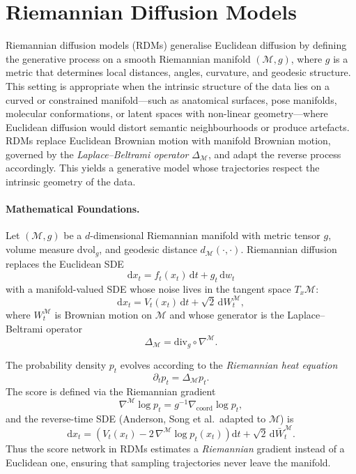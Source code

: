 \section{Riemannian Diffusion Models}
\label{sec:riemannian_diffusion_models}
Riemannian diffusion models (RDMs) generalise Euclidean diffusion by defining
the generative process on a smooth Riemannian manifold $(\mathcal{M},g)$, where
$g$ is a metric that determines local distances, angles, curvature, and
geodesic structure. This setting is appropriate when the intrinsic structure of
the data lies on a curved or constrained manifold—such as anatomical surfaces,
pose manifolds, molecular conformations, or latent spaces with non-linear
geometry—where Euclidean diffusion would distort semantic neighbourhoods or
produce artefacts. RDMs replace Euclidean Brownian motion with manifold
Brownian motion, governed by the \emph{Laplace–Beltrami operator}
$\Delta_{\mathcal{M}}$, and adapt the reverse process accordingly. This yields
a generative model whose trajectories respect the intrinsic geometry of the
data.

\paragraph{Mathematical Foundations.}

Let $(\mathcal{M}, g)$ be a $d$-dimensional Riemannian manifold with metric
tensor $g$, volume measure $\mathrm{d}\mathrm{vol}_g$, and geodesic distance
$d_{\mathcal{M}}(\cdot,\cdot)$. Riemannian diffusion replaces the Euclidean SDE
\[
\mathrm{d}x_t
    = f_t(x_t)\,\mathrm{d}t + g_t \,\mathrm{d}w_t
\]
with a manifold-valued SDE whose noise lives in the tangent space
$T_x\mathcal{M}$:
\[
\mathrm{d}x_t
    = V_t(x_t)\,\mathrm{d}t + \sqrt{2}\, \mathrm{d}W_t^{\mathcal{M}},
\]
where $W_t^{\mathcal{M}}$ is Brownian motion on $\mathcal{M}$ and whose
generator is the Laplace--Beltrami operator
\[
\Delta_{\mathcal{M}} = \mathrm{div}_g \circ \nabla^{\mathcal{M}}.
\]

The probability density $p_t$ evolves according to the \emph{Riemannian heat
equation}
\[
\partial_t p_t = \Delta_{\mathcal{M}} p_t.
\]
The score is defined via the Riemannian gradient
\[
\nabla^{\mathcal{M}} \log p_t
    = g^{-1} \nabla_{\text{coord}} \log p_t,
\]
and the reverse-time SDE (Anderson, Song et al.\ adapted to $\mathcal{M}$) is
\[
\mathrm{d}x_t
    = \left( V_t(x_t)
        - 2\, \nabla^{\mathcal{M}} \log p_t(x_t)
      \right) \mathrm{d}t
      + \sqrt{2}\,\mathrm{d}\bar{W}_t^{\mathcal{M}}.
\]
Thus the score network in RDMs estimates a \emph{Riemannian} gradient instead of
a Euclidean one, ensuring that sampling trajectories never leave the manifold.

